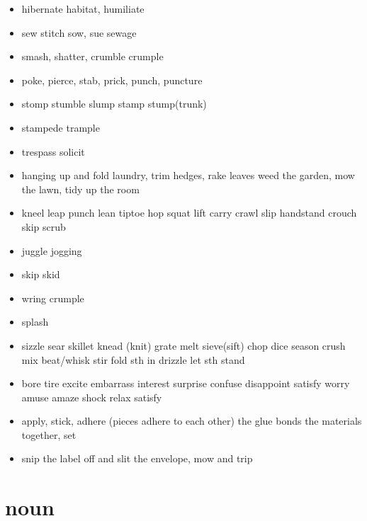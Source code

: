 \documentclass[a4paper,11pt,twoside]{book}
\begin{document}
\begin{itemize}
	\item hibernate habitat, humiliate
	
	\item sew stitch sow,  sue sewage
	
	\item smash, shatter, crumble crumple
	
	\item poke, pierce, stab, prick, punch, puncture
	
	\item stomp stumble slump stamp stump(trunk) 
	
	\item stampede trample 
	
	\item trespass solicit
	
	\item hanging up and fold laundry, trim hedges, rake leaves weed the garden, mow the lawn,  tidy up the room
	
	\item kneel leap punch lean tiptoe hop squat lift carry crawl slip handstand crouch skip scrub 
	
	\item juggle jogging
	
	\item skip skid
	
	\item wring crumple
	
	\item splash 
	
	\item sizzle sear skillet knead (knit) grate melt sieve(sift) chop dice season crush mix beat/whisk stir fold sth in drizzle let sth stand
	
	\item bore tire excite embarrass interest surprise confuse disappoint satisfy worry amuse amaze shock relax satisfy
	
	\item apply, stick,  adhere (pieces adhere to each other) the glue bonds the materials together,   set
	
	\item snip the label off and slit the envelope, mow and trip 
	
\end{itemize}

\section{noun}
\end{document}
